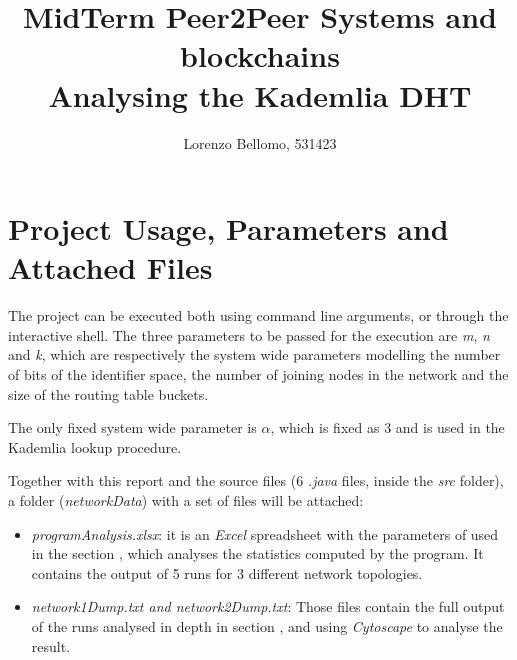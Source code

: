 \documentclass[11pt, a4paper]{report}
\title{%
	MidTerm Peer2Peer Systems and blockchains \\
	\large Analysing the Kademlia DHT}
\author{Lorenzo Bellomo, 531423}
\date{}
\begin{document}
\maketitle

\section*{Project Usage, Parameters and Attached Files}

	The project can be executed both using command line arguments, or through the interactive shell. The three parameters to be passed for the execution are \emph{m}, \emph{n} and \emph{k}, which are respectively the system wide parameters modelling the number of bits of the identifier space, the number of joining nodes in the network and the size of the routing table buckets. 
	\par 
	The only fixed system wide parameter is $\alpha$, which is fixed as $3$ and is used in the Kademlia lookup procedure. 
	\par
	Together with this report and the source files (6 \emph{.java} files, inside the \emph{src} folder), a folder (\emph{networkData}) with a set of files will be attached:
	\begin{itemize}
		\item \emph{programAnalysis.xlsx}: it is an \emph{Excel} spreadsheet with the parameters of used in the section , which analyses the statistics computed by the program. It contains the output of 5 runs for 3 different network topologies. 
		\item \emph{network1Dump.txt and network2Dump.txt}: Those files contain the full output of the runs analysed in depth in section , and using \emph{Cytoscape} to analyse the result.
	\end{itemize}
\end{document}
